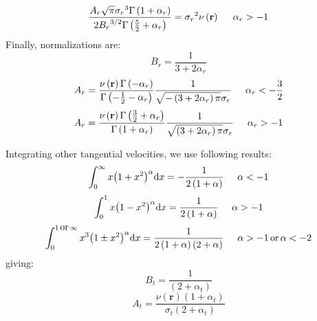 %
\begin{equation}
    \frac{A_r\sqrt\pi{\sigma_r}^3\Gamma\left(1+\alpha_r\right)}
    {2{B_r}^{3/2}\Gamma\left(\frac{5}{2}+\alpha_r\right)}=
    {\sigma_r}^2\nu\left(\textbf{r}\right)\hspace{0.5cm}\alpha_r>-1
\end{equation}
%
Finally, normalizations are:
%
\begin{equation}
    B_r=\frac{1}{3+2\alpha_r}
\end{equation}
%
\begin{equation}
    A_r=\frac{\nu\left(\textbf{r}\right)\Gamma\left(-\alpha_r\right)}
    {\Gamma\left(-\frac{1}{2}-\alpha_r\right)}
    \frac{1}{\sqrt{-\left(3+2\alpha_r\right)\pi}\sigma_r}
    \hspace{0.5cm}\alpha_r<-\frac{3}{2}
\end{equation}
%
\begin{equation}
    A_r=
    \frac{\nu\left(\textbf{r}\right)\Gamma\left(\frac{3}{2}+\alpha_r\right)}
    {\Gamma\left(1+\alpha_r\right)}
    \frac{1}{\sqrt{\left(3+2\alpha_r\right)\pi}\sigma_r}
    \hspace{0.5cm}\alpha_r>-1
\end{equation}

Integrating other tangential velocities, we use following results:
%
\begin{equation}
    \int_0^\infty x{\left(1+x^2\right)}^\alpha{\rm{d}} x=
    -\frac{1}{2\left(1+\alpha\right)}\hspace{0.5cm}\alpha<-1
\end{equation}
%
\begin{equation}
    \int_0^1 x{\left(1-x^2\right)}^\alpha{\rm{d}} x=
    \frac{1}{2\left(1+\alpha\right)}\hspace{0.5cm}\alpha>-1
\end{equation}
%
\begin{equation}
    \int_0^{1\,\mbox{or}\,\infty} x^3{\left(1\pm x^2\right)}^\alpha{\rm{d}} x=
    \frac{1}{2\left(1+\alpha\right)\left(2+\alpha\right)}
    \hspace{0.5cm}\alpha>-1\,\mbox{or}\,\alpha<-2
\end{equation}
%
giving:
%
\begin{equation}
    B_t=\frac{1}{\left(2+\alpha_t\right)}
\end{equation}
%
\begin{equation}
    A_t=\frac{\nu\left(\textbf{r}\right)\left(1+\alpha_t\right)}
    {\sigma_t\left(2+\alpha_t\right)}
\end{equation}

